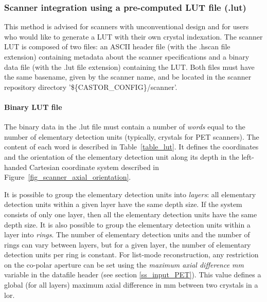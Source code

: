 \documentclass[a4paper, 11pt]{article}
\begin{document}
\subsubsection{Scanner integration using a pre-computed LUT file (.lut)}
\label{sss_scanner_integration_PET_uLUT}

This method is advised for scanners with unconventional design and for users who would like to generate a LUT with their own crystal indexation. 
The scanner LUT is composed of two files: an ASCII header file (with the .hscan file extension) containing metadata about the scanner specifications and
a binary data file (with the .lut file extension) containing the LUT. 
Both files must have the same basename, given by the scanner name, and be located in the scanner repository directory '\$\{CASTOR\_CONFIG\}/scanner'.

\paragraph{Binary LUT file}
The binary data in the .lut file must contain a number of {\it words} equal to the number of elementary detection units (typically, crystals for PET scanners). 
The content of each word is described in Table~\ref{table_lut}. 
It defines the coordinates and the orientation of the elementary detection unit along its depth in the left-handed Cartesian coordinate system described in
Figure~\ref{fig_scanner_axial_orientation}. 

It is possible to group the elementary detection units into \textit{layers}: all elementary detection units within a given layer have the same depth size.
If the system consists of only one layer, then all the elementary detection units have the same depth size.
It is also possible to group the elementary detection units within a layer into \textit{rings}.
The number of elementary detection units and the number of rings can vary between layers,
but for a given layer, the number of elementary detection units per ring is constant.  
For list-mode reconstruction, any restriction on the co-polar aperture can be set using the \textit{maximum axial difference mm} variable in the datafile header (see section \ref{ss_input_PET}). This value defines a global (for all layers) maximum axial difference in mm between two crystals in a lor.
\end{document}
